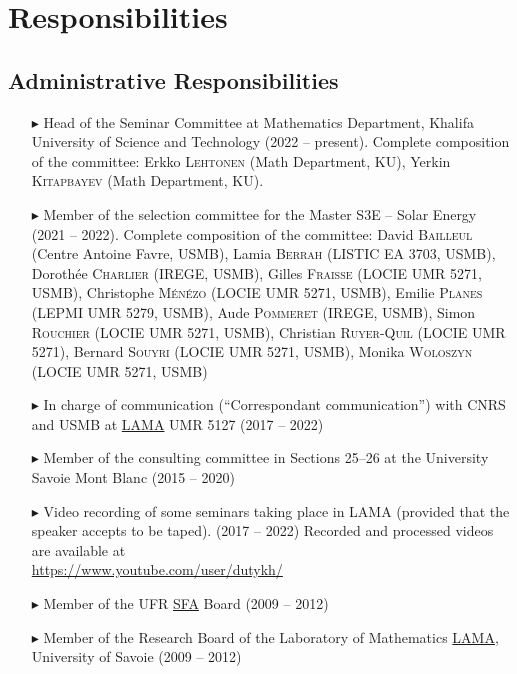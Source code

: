 \section{Responsibilities}

    \subsection{Administrative Responsibilities}
    \begin{itemize}
        \item[$\blacktriangleright$] Head of the Seminar Committee at Mathematics Department, Khalifa University of Science and Technology (2022 -- present). Complete composition of the committee: Erkko \textsc{Lehtonen} (Math Department, KU), Yerkin \textsc{Kitapbayev} (Math Department, KU).
        \item[$\blacktriangleright$] Member of the selection committee for the Master S3E -- Solar Energy (2021 -- 2022). Complete composition of the committee: David \textsc{Bailleul} (Centre Antoine Favre, USMB), Lamia \textsc{Berrah} (LISTIC EA 3703, USMB), Doroth\'ee \textsc{Charlier} (IREGE, USMB), Gilles \textsc{Fraisse} (LOCIE UMR 5271, USMB), Christophe \textsc{M\'en\'ezo} (LOCIE UMR 5271, USMB), Emilie \textsc{Planes} (LEPMI UMR 5279, USMB), Aude \textsc{Pommeret} (IREGE, USMB), Simon \textsc{Rouchier} (LOCIE UMR 5271, USMB), Christian \textsc{Ruyer-Quil} (LOCIE UMR 5271), Bernard \textsc{Souyri} (LOCIE UMR 5271, USMB), Monika \textsc{Woloszyn} (LOCIE UMR 5271, USMB)
        \item[$\blacktriangleright$] In charge of communication (``Correspondant communication'') with CNRS and USMB at \href{http://www.lama.univ-savoie.fr}{LAMA} UMR 5127 (2017 -- 2022)
        \item[$\blacktriangleright$] Member of the consulting committee in Sections 25--26 at the University Savoie Mont Blanc (2015 -- 2020)
        \item[$\blacktriangleright$] Video recording of some seminars taking place in LAMA (provided that the speaker accepts to be taped). (2017 -- 2022) Recorded and processed videos are available at \\
        \url{https://www.youtube.com/user/dutykh/}
        \item[$\blacktriangleright$] Member of the UFR \href{http://www.sfa.univ-savoie.fr/}{SFA} Board (2009 -- 2012)
        \item[$\blacktriangleright$] Member of the Research Board of the Laboratory of Mathematics \href{http://www.lama.univ-savoie.fr}{LAMA}, University of Savoie (2009 -- 2012)

\end{itemize}
